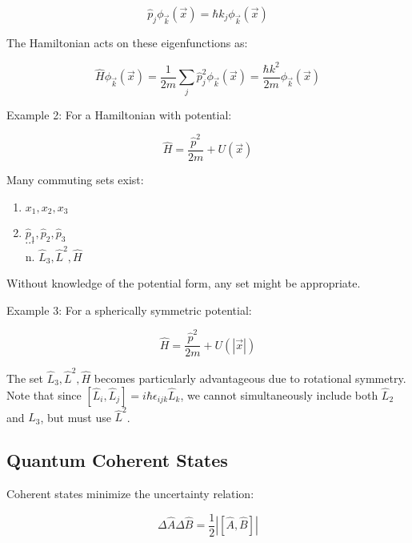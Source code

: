 \documentclass[italian]{HKNdocument}
\begin{document}
\begin{equation}
\hat{p}_{j} \phi_{\vec{k}}(\vec{x})=\hbar k_{j} \phi_{\vec{k}}(\vec{x})
\end{equation}

The Hamiltonian acts on these eigenfunctions as:

\begin{equation}
\hat{H} \phi_{\vec{k}}(\vec{x})=\frac{1}{2 m} \sum_{j} \hat{p}_{j}^{2} \phi_{\vec{k}}(\vec{x})=\frac{\hbar k^{2}}{2 m} \phi_{\vec{k}}(\vec{x})
\end{equation}

Example 2: For a Hamiltonian with potential:

\begin{equation}
\hat{H}=\frac{\hat{p}^{2}}{2 m}+U(\vec{x})
\end{equation}

Many commuting sets exist:
\begin{enumerate}
  \item $x_{1}, x_{2}, x_{3}$
  \item $\hat{p}_{1}, \hat{p}_{2}, \hat{p}_{3}$\\
$\cdots$\\
n. $\hat{L}_{3}, \hat{L}^{2}, \hat{H}$
\end{enumerate}

Without knowledge of the potential form, any set might be appropriate.

Example 3: For a spherically symmetric potential:

\begin{equation}
\hat{H}=\frac{\hat{p}^{2}}{2 m}+U(|\vec{x}|)
\end{equation}

The set $\hat{L}_{3}, \hat{L}^{2}, \hat{H}$ becomes particularly advantageous due to rotational symmetry. Note that since $\left[\hat{L}_{i}, \hat{L}_{j}\right]=i \hbar \epsilon_{i j k} \hat{L}_{k}$, we cannot simultaneously include both $\hat{L}_{2}$ and $\hat{L}_{3}$, but must use $\hat{L}^{2}$.

\subsection{Quantum Coherent States}
Coherent states minimize the uncertainty relation:

\begin{equation}
\Delta \hat{A} \Delta \hat{B}=\frac{1}{2}|[\hat{A}, \hat{B}]|
\end{equation}
\end{document}
